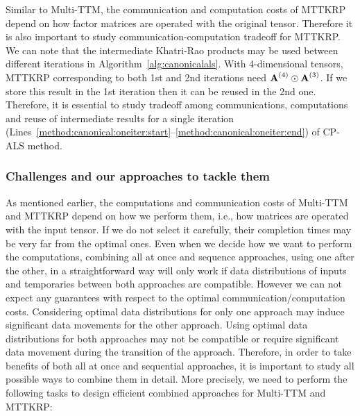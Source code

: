 \documentclass[a4paper,11pt]{article}
\begin{document}
%	
	
	Similar to Multi-TTM, the communication and computation costs of MTTKRP depend on how factor matrices are operated with the original tensor. Therefore it is also important to study communication-computation tradeoff for MTTKRP. We can note that the intermediate Khatri-Rao products may be used between different iterations in Algorithm~\ref{alg:canonicalals}. With 4-dimensional tensors, MTTKRP corresponding to both 1st and 2nd iterations need $\Mn{A}{4}\odot\Mn{A}{3}$. If we store this result in the 1st iteration then it can be reused in the 2nd one. Therefore, it is essential to study tradeoff among communications, computations and reuse of intermediate results for a single iteration (Lines~\ref{method:canonical:oneiter:start}--\ref{method:canonical:oneiter:end}) of CP-ALS method.
	
	
	
	\subsubsection{Challenges and our approaches to tackle them}
	
	As mentioned earlier, the computations and communication costs of Multi-TTM and MTTKRP depend on how we perform them, i.e., how matrices are operated with the input tensor. If we do not select it carefully, their completion times may be very far from the optimal ones. Even when we decide how we want to perform the computations, combining all at once and sequence approaches, using one after the other, in a straightforward way will only work if data distributions of inputs and temporaries between both approaches are compatible. However we can not expect any guarantees with respect to the optimal communication/computation costs. Considering optimal data distributions for only one approach may induce significant data movements for the other approach. Using optimal data distributions for both approaches may not be compatible or require significant data movement during the transition of the approach. Therefore, in order to take benefits of both all at once and sequential approaches, it is important to study all possible ways to combine them in detail. More precisely, we need to perform the following tasks to design efficient combined approaches for Multi-TTM and MTTKRP:
	
\end{document}
